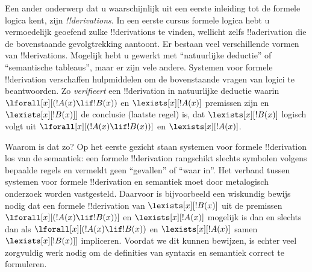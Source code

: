 \documentclass[../../../include/open-logic-section]{subfiles}
\begin{document}
Een ander onderwerp dat u waarschijnlijk uit een eerste inleiding tot
de formele logica kent, zijn \emph{!!{derivation}s}. In een eerste cursus
formele logica hebt u vermoedelijk geoefend zulke !!{derivation}s te
vinden, wellicht zelfs !!a{derivation} die de bovenstaande
gevolgtrekking aantoont. Er bestaan veel verschillende vormen van
!!{derivation}s. Mogelijk hebt u gewerkt met ``natuurlijke deductie'' of
``semantische tableaus'', maar er zijn vele andere. Systemen voor formele
!!{derivation} verschaffen hulpmiddelen om de bovenstaande vragen van logici
te beantwoorden. Zo \emph{verifieert} een !!{derivation} in natuurlijke
deductie waarin $\lforall[x][(!A(x) \lif !B(x))$ en
$\lexists[x][!A(x)]$ premissen zijn en $\lexists[x][!B(x)]]$ de conclusie
(laatste regel) is, dat $\lexists[x][!B(x)]$ logisch volgt uit
$\lforall[x][(!A(x) \lif !B(x))]$ en $\lexists[x][!A(x)]$.

Waarom is dat zo? Op het eerste gezicht staan systemen voor formele !!{derivation}
los van de semantiek: een formele !!{derivation} rangschikt slechts
symbolen volgens bepaalde regels en vermeldt geen ``gevallen'' of ``waar
in''. Het verband tussen systemen voor formele !!{derivation} en semantiek moet door
metalogisch onderzoek worden vastgesteld. Daarvoor is bijvoorbeeld een
wiskundig bewijs nodig dat een formele !!{derivation} van
$\lexists[x][!B(x)]$ uit de premissen
$\lforall[x][(!A(x) \lif !B(x))]$ en $\lexists[x][!A(x)]$ mogelijk is dan
en slechts dan als $\lforall[x][(!A(x) \lif !B(x))$ en
$\lexists[x][!A(x)]$ samen $\lexists[x][!B(x)]]$ impliceren. Voordat we
dit kunnen bewijzen, is echter veel zorgvuldig werk nodig om de
definities van syntaxis en semantiek correct te formuleren.
\end{document}
